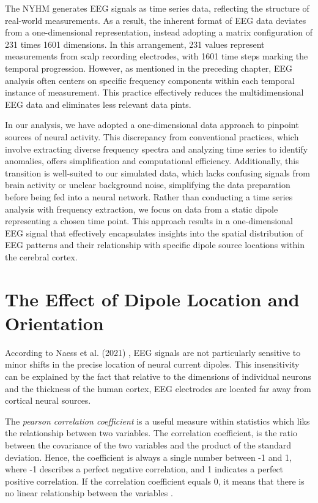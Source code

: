 \documentclass[a4paper, UKenglish, 11pt]{uiomaster}
\begin{document}
The NYHM generates EEG signals as time series data, reflecting the structure of real-world measurements. As a result, the inherent format of EEG data deviates from a one-dimensional representation, instead adopting a matrix configuration of 231 times 1601 dimensions. In this arrangement, 231 values represent measurements from scalp recording electrodes, with 1601 time steps marking the temporal progression. However, as mentioned in the preceding chapter, EEG analysis often centers on specific frequency components within each temporal instance of measurement. This practice effectively reduces the multidimensional EEG data and eliminates less relevant data pints.

In our analysis, we have adopted a one-dimensional data approach to pinpoint sources of neural activity. This discrepancy from conventional practices, which involve extracting diverse frequency spectra and analyzing time series to identify anomalies, offers simplification and computational efficiency. Additionally, this transition is well-suited to our simulated data, which lacks confusing signals from brain activity or unclear background noise, simplifying the data preparation before being fed into a neural network. Rather than conducting a time series analysis with frequency extraction, we focus on data from a static dipole representing a chosen time point. This approach results in a one-dimensional EEG signal that effectively encapsulates insights into the spatial distribution of EEG patterns and their relationship with specific dipole source locations within the cerebral cortex.

\section{The Effect of Dipole Location and Orientation}
According to Naess et al. (2021) \cite{naess2021biophysically}, EEG signals are not particularly sensitive to minor shifts in the precise location of neural current dipoles. This insensitivity can be explained by the fact that relative to the dimensions of individual neurons and the thickness of the human cortex, EEG electrodes are located far away from cortical neural sources.

The \emph{pearson correlation coefficient} is a useful measure within statistics which liks the relationship between two variables. The correlation coefficient, is the ratio between the covariance of the two variables and the product of the standard deviation. Hence, the coefficient is always a single number between -1 and 1, where -1 describes a perfect negative correlation, and 1 indicates a perfect positive correlation. If the correlation coefficient equals 0, it means that there is no linear relationship between the variables \cite{numpy-docs}.
\end{document}

